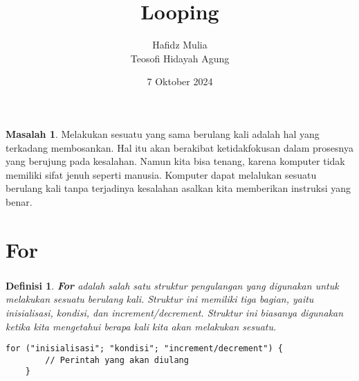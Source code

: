 \documentclass[aspectratio=169]{beamer}
\author[Tew \& Haf]{Hafidz Mulia\\Teosofi Hidayah Agung}
\date{7 Oktober 2024}
\title[Alpro 1 - Week 5]{Looping}
\institute[Matematika ITS]{Departemen Matematika\\ Institut Teknologi Sepuluh Nopember}
\newtheorem*{definisi}{Definisi}
\theoremstyle{definition}
\newtheorem*{masalah}{Masalah}
\begin{document}
    {
    \begin{frame}
        \titlepage
    \end{frame}
    }


    {
    \begin{frame}
        \begin{masalah}
            Melakukan sesuatu yang sama berulang kali adalah hal yang terkadang membosankan. Hal itu akan berakibat ketidakfokusan dalam prosesnya yang berujung pada kesalahan. Namun kita bisa tenang, karena komputer tidak memiliki sifat jenuh seperti manusia. Komputer dapat melalukan sesuatu berulang kali tanpa terjadinya kesalahan asalkan kita memberikan instruksi yang benar.
        \end{masalah}
    \end{frame}
    }

    \section{For}
    \begin{frame}[fragile]
        \frametitle{\insertsection}
        \begin{definisi}
            \textbf{For} adalah salah satu struktur pengulangan yang digunakan untuk melakukan sesuatu berulang kali. Struktur ini memiliki tiga bagian, yaitu inisialisasi, kondisi, dan increment/decrement. Struktur ini biasanya digunakan ketika kita mengetahui berapa kali kita akan melakukan sesuatu.
        \end{definisi}
        \begin{lstlisting}[caption={Syntax For}, numbers=none]
    for ("inisialisasi"; "kondisi"; "increment/decrement") {
        // Perintah yang akan diulang
    }
        \end{lstlisting}
    \end{frame}
\end{document}
